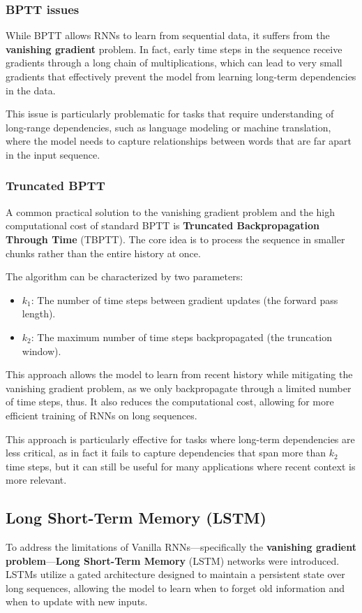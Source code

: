 \subsubsection{BPTT issues}
While BPTT allows RNNs to learn from sequential data, it suffers from the \textbf{vanishing gradient} problem.
In fact, early time steps in the sequence receive gradients through a long chain of multiplications, 
which can lead to very small gradients that effectively prevent the model from learning long-term dependencies in the data.

This issue is particularly problematic for tasks that require understanding of long-range dependencies, such as language modeling or machine translation, 
where the model needs to capture relationships between words that are far apart in the input sequence.

\subsubsection{Truncated BPTT}
A common practical solution to the vanishing gradient problem and the high 
computational cost of standard BPTT is \textbf{Truncated Backpropagation Through Time} (TBPTT). 
The core idea is to process the sequence in smaller chunks rather than the entire history at once.

The algorithm can be characterized by two parameters:
\begin{itemize}
    \item $k_1$: The number of time steps between gradient updates (the forward pass length).
    \item $k_2$: The maximum number of time steps backpropagated (the truncation window).
\end{itemize}
This approach allows the model to learn from recent history while mitigating the vanishing gradient problem, as we only backpropagate through a limited number of time steps, 
thus. It also reduces the computational cost, allowing for more efficient training of RNNs on long sequences.

This approach is particularly effective for tasks where long-term dependencies are less critical, as in fact
it fails to capture dependencies that span more than $k_2$ time steps, but it can still be useful for many applications where recent context is more relevant.

\subsection{Long Short-Term Memory (LSTM)}
To address the limitations of Vanilla RNNs—specifically the \textbf{vanishing gradient problem}—\textbf{Long Short-Term Memory} (LSTM) 
networks were introduced. LSTMs utilize a gated architecture designed to maintain a persistent state over long sequences, 
allowing the model to learn when to forget old information and when to update with new inputs.

